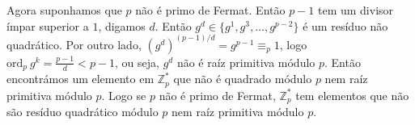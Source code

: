 \documentclass[main.tex]{subfiles}
\renewcommand*{\ord}[1]{\ensuremath{\text{ord}_#1\:}}
\begin{document}
\begin{solution}
Agora suponhamos que $p$ não é primo de Fermat.
Então $p-1$ tem um divisor ímpar superior a $1$, digamos $d$.
Então $g^d\in\{g^1,g^3,\dots,g^{p-2}\}$ é um resíduo não quadrático.
Por outro lado, $(g^d)^{(p-1)/d}=g^{p-1}\equiv_p 1$, logo
$\ord{p}g^k=\frac{p-1}{d}<p-1$, ou seja, $g^d$ não é raíz primitiva
módulo $p$.
Então encontrámos um elemento em $\mathbb{Z}_p^*$ que não é quadrado
módulo $p$ nem raíz primitiva módulo $p$.
Logo se $p$ não é primo de Fermat, $\mathbb{Z}_p^*$ tem elementos que
não são resíduo quadrático módulo $p$ nem raíz primitiva módulo $p$. 
\end{solution}
\end{document}
